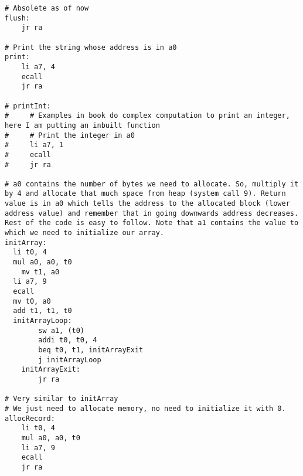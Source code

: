 \begin{verbatim}
# Absolete as of now
flush:
    jr ra

# Print the string whose address is in a0
print:
    li a7, 4
    ecall
    jr ra

# printInt:
#     # Examples in book do complex computation to print an integer, here I am putting an inbuilt function
#     # Print the integer in a0
#     li a7, 1
#     ecall
#     jr ra

# a0 contains the number of bytes we need to allocate. So, multiply it by 4 and allocate that much space from heap (system call 9). Return value is in a0 which tells the address to the allocated block (lower address value) and remember that in going downwards address decreases. Rest of the code is easy to follow. Note that a1 contains the value to which we need to initialize our array.
initArray:
  li t0, 4
  mul a0, a0, t0
    mv t1, a0
  li a7, 9
  ecall
  mv t0, a0
  add t1, t1, t0
  initArrayLoop:
        sw a1, (t0)
        addi t0, t0, 4
        beq t0, t1, initArrayExit
        j initArrayLoop
    initArrayExit:
        jr ra

# Very similar to initArray
# We just need to allocate memory, no need to initialize it with 0.
allocRecord:
    li t0, 4
    mul a0, a0, t0
    li a7, 9
    ecall
    jr ra
\end{verbatim}